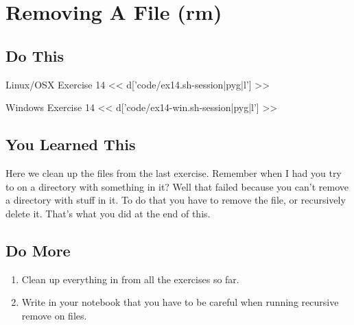 \chapter{Removing A File (rm)}

\section{Do This}

\begin{code}{Linux/OSX Exercise 14}
<< d['code/ex14.sh-session|pyg|l'] >>
\end{code}

\begin{code}{Windows Exercise 14}
<< d['code/ex14-win.sh-session|pyg|l'] >>
\end{code}

\section{You Learned This}

Here we clean up the files from the last exercise.  Remember when I had you
try to  on a directory with something in it?  Well that failed
because you can't remove a directory with stuff in it.  To do that you have
to remove the file, or recursively delete it.  That's what you did at the
end of this.

\section{Do More}

\begin{enumerate}
\item Clean up everything in  from all the exercises so far.
\item Write in your notebook that you have to be careful when running recursive
    remove on files.
\end{enumerate}

